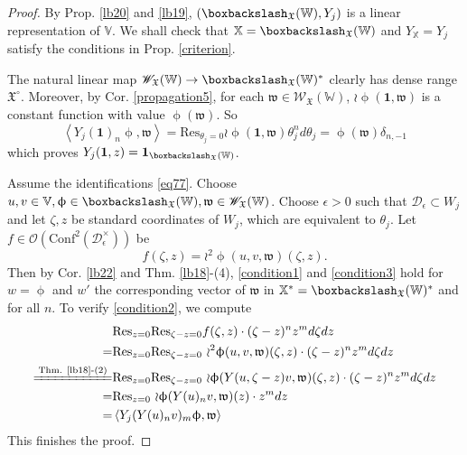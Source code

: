 \documentclass[11pt,b5paper,notitlepage]{article}
\theoremstyle{definition}
\theoremstyle{plain}
\newcommand{\fk}{\mathfrak}
\newcommand{\Conf}{\mathrm{Conf}}
\newcommand{\Res}{\mathrm{Res}}
\newcommand{\scr}{\mathscr}
\newcommand{\Vbb}{\mathbb V}
\newcommand{\Xbb}{\mathbb X}
\newcommand{\Wbb}{\mathbb W}
\newcommand{\ibf}{\mathbf 1}
\newcommand{\<}{\left\langle}
\renewcommand{\>}{\right\rangle}
\newcommand{\MO}{\mathcal{O}}
\newcommand{\fx}{\mathfrak{X}}
\newcommand{\MD}{\mathcal{D}}
\newcommand{\bbs}{\boxbackslash}
\numberwithin{equation}{section}
\begin{document}
\begin{proof}
By Prop. \ref{lb20} and \ref{lb19},  $(\boxbackslash_{\fx}(\Wbb),Y_j)$ is a linear representation of $\Vbb$. We shall check that $\Xbb=\bbs_\fx(\Wbb)$ and $Y_\Xbb=Y_j$ satisfy the conditions in Prop. \ref{criterion}.
     
The natural linear map $\scr W_{\fk X}(\Wbb)\rightarrow \boxbackslash_\fx(\Wbb)^*$ clearly has dense range $\fk X^\circ$. Moreover, by Cor. \ref{propagation5}, for each $\fk w\in\scr W_{\fk X}(\Wbb)$, $\wr\upphi(\ibf,\fk w)$ is a constant function with value $\upphi(\fk w)$. So 
    $$
    \<Y_j(\ibf)_n\upphi,\fk w\>=\Res_{\theta_j=0}\wr\upphi(\ibf,\fk w)\theta_j^n d\theta_j=\upphi(\fk w)\delta_{n,-1}
    $$
    which proves $Y_j(\ibf,z)=\ibf_{\boxbackslash_\fx(\Wbb)}$.
     
Assume the identifications \eqref{eq77}.  Choose $u,v\in \Vbb,\upphi\in \boxbackslash_\fx(\Wbb),\fk w\in \scr W_\fx(\Wbb)$. Choose $\epsilon>0$ such that $\MD_\epsilon\subset W_j$ and let $\zeta,z$ be standard coordinates of $W_j$, which are equivalent to $\theta_j$. Let $f\in \MO(\Conf^2(\MD_\epsilon^\times))$ be 
    $$
    f(\zeta,z)=\wr^2\upphi(u,v,\fk w)(\zeta,z).
    $$
Then by Cor. \ref{lb22} and Thm. \ref{lb18}-(4), \eqref{condition1} and \eqref{condition3} hold for $w=\upphi$ and $w'$ the corresponding vector of $\fk w$ in $\Xbb^*=\bbs_\fx(\Wbb)^*$ and for all $n$. To verify \eqref{condition2}, we compute  
\begin{align*}
 &\Res_{z=0}\Res_{\zeta-z=0}f(\zeta,z)\cdot (\zeta-z)^n z^m d\zeta dz\\
    =&\Res_{z=0}\Res_{\zeta-z=0}~{\wr^2\upphi}(u,v,\fk w)(\zeta,z)\cdot (\zeta-z)^n z^m d\zeta dz\\
\xlongequal{\text{Thm. \ref{lb18}-(2)}}&\Res_{z=0}\Res_{\zeta-z=0}~{\wr\upphi}(Y(u,\zeta-z)v,\fk w)(\zeta,z)\cdot (\zeta-z)^n z^m d\zeta dz\\
    =&\Res_{z=0}~{\wr\upphi}(Y(u)_nv,\fk w)(z)\cdot  z^m  dz\\
    =&\<Y_j(Y(u)_n v)_m\upphi,\fk w\>
\end{align*}
This finishes the proof.
\end{proof}
\end{document}
